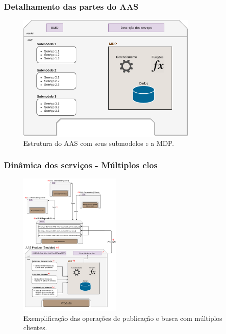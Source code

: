\documentclass[10pt]{beamer}
\begin{document}
\begin{frame}
	
	\frametitle{Detalhamento das partes do AAS}
	
	\begin{figure}[htb]
		\centering
		\caption{Estrutura do AAS com seus submodelos e a MDP.}
		\label{fig:estrutura-aas}
		\includegraphics[width=0.8\textwidth]{estrutura-aas}
	\end{figure}
	
\end{frame}
\begin{frame}
	
	\frametitle{Dinâmica dos serviços - Múltiplos elos}
	
	\begin{figure}[htb]
		\centering
		\caption{Exemplificação das operações de publicação e busca com múltiplos clientes.}
		\label{fig:webservice-multielo}
		\includegraphics[width=0.45\textwidth]{webservice-multielo}
	\end{figure}
	
\end{frame}
\end{document}
